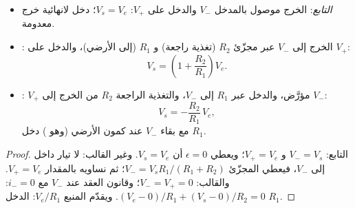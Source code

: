 \begin{proposition}\label{prop:b1:operational-amplifier:basic}
\begin{itemize}
  \item \emph{التابع}: الخرج موصول بالمدخل $V_-$ والدخل على $V_+$:
        $V_s = V_e$؛  دخل لانهائية  خرج معدومة.
  \item \emph{}: الخرج إلى $V_-$ عبر
        مجزّئ $R_2$ (تغذية راجعة) و $R_1$ (إلى الأرضي)، والدخل على $V_+$:
        \[
        V_s = \left(1 + \frac{R_2}{R_1}\right)V_e .
        \]
  \item \emph{}: $V_+$ مؤرَّض، والدخل عبر
        $R_1$ إلى $V_-$، والتغذية الراجعة $R_2$ من الخرج إلى $V_-$:
        \[
        V_s = -\frac{R_2}{R_1}\,V_e ,
        \]
        مع بقاء $V_-$ عند كمون الأرضي (وهو \emph{})
         دخل $R_1$.
\end{itemize}
\end{proposition}

\begin{proof}
التابع: $V_- = V_s$ و $V_+ = V_e$؛ ويعطي $\epsilon = 0$ أن $V_s = V_e$.
وغير القالب: لا تيار داخل إلى $V_-$، فيعطي المجزّئ $V_- =
V_sR_1/(R_1 + R_2)$؛ ثم نساويه بالمقدار $V_+ = V_e$. والقالب: $V_- = V_+ = 0$؛
وقانون العقد عند $V_-$ مع $i_- = 0$: $(V_e - 0)/R_1 + (V_s - 0)/R_2 = 0$.
ويقدّم المنبع $V_e/R_1$:  الدخل $R_1$.
\end{proof}

